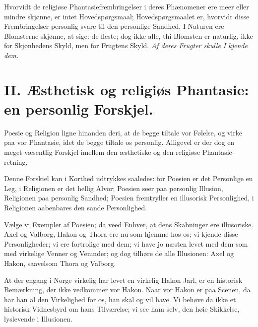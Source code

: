 \documentclass[12pt,a4paper]{book}
\newcommand{\apage}[1]{\marginnote{\footnotesize\textit{[#1]}}}
\begin{document}
Hvorvidt de religiøse Phantasiefrembringelser i deres Phænomener ere meer eller mindre skjønne, er intet Hovedspørgsmaal; Hovedspørgsmaalet er, hvorvidt disse Frembringelser personlig svare til den personlige Sandhed. I Naturen ere Blomsterne skjønne, at sige: de fleste; dog ikke alle, thi Blomsten er naturlig, ikke for Skjønhedens Skyld, men for Frugtens Skyld. \emph{Af deres Frugter skulle I kjende dem.}

\chapter*{II. Æsthetisk og religiøs Phantasie: en personlig Forskjel.}
\label{ch:forel2}

Poesie og Religion ligne hinanden deri, at de begge tiltale vor Følelse, og
virke paa vor Phantasie, idet de begge tiltale os \apage{12} personlig. Alligevel er der
dog en meget væsentlig Forskjel imellem den æsthetiske og den religiøse
Phantasie-retning.

Denne Forskiel kan i Korthed udtrykkes saaledes: for Poesien er det Personlige
en Leg, i Religionen er det hellig Alvor; Poesien seer paa personlig Illusion,
Religionen paa personlig Sandhed; Poesien fremtryller en illusorisk
Personlighed, i Religionen aabenbares den sande Personlighed.

Vælge vi Exempler af Poesien; da veed Enhver, at dens Skabninger ere
illusoriske. Axel og Valborg, Hakon og Thora ere nu som hjemme hos os; vi
kjende disse Personligheder; vi ere fortrolige med dem; vi have jo næsten
levet med dem som med virkelige Venner og Veninder; og dog tilhøre de alle
Illusionen: Axel og Hakon, saavelsom Thora og Valborg.

At der engang i Norge virkelig har levet en virkelig Hakon Jarl, er en
historisk Bemærkning, der ikke vedkommer vor Hakon. Naar vor Hakon er paa
Scenen, da har han al den Virkelighed for os, han skal og vil have. Vi behøve
da ikke et historisk Vidnesbyrd om hans Tilværelse; vi see \apage{13} ham selv, den høie
Skikkelse, lyslevende i Illusionen.
\end{document}
